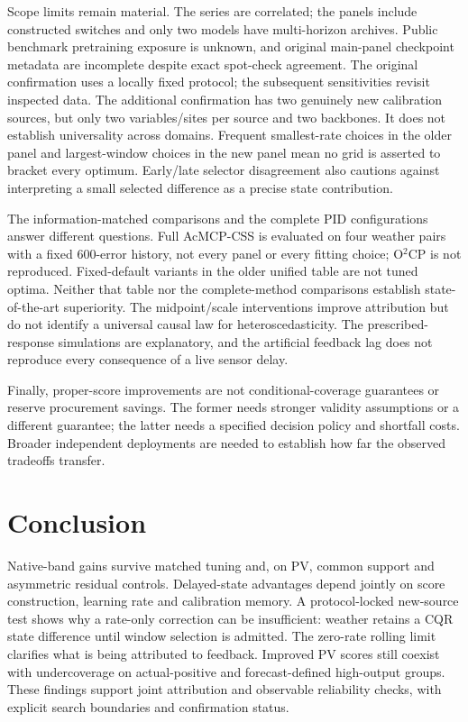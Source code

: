 \documentclass[preprint,11pt]{elsarticle}
\begin{document}
Scope limits remain material. The series are correlated; the panels include constructed
switches and only two models have multi-horizon archives. Public benchmark pretraining
exposure is unknown, and original main-panel checkpoint metadata are incomplete despite
exact spot-check agreement. The original confirmation uses a locally fixed protocol;
the subsequent sensitivities revisit inspected data. The additional confirmation has
two genuinely new calibration sources, but only two variables/sites per source and two
backbones. It does not establish universality across domains. Frequent smallest-rate
choices in the older panel and largest-window choices in the new panel mean no grid
is asserted to bracket every optimum. Early/late selector disagreement also cautions
against interpreting a small selected difference as a precise state contribution.

The information-matched comparisons and the complete PID configurations answer
different questions. Full AcMCP-CSS is evaluated on four weather pairs with a fixed
600-error history, not every panel or every fitting choice; O$^2$CP is not reproduced.
Fixed-default variants in the older unified table are not tuned optima. Neither that
table nor the complete-method comparisons establish state-of-the-art superiority.
The midpoint/scale interventions
improve attribution but do not identify a universal causal law for heteroscedasticity.
The prescribed-response simulations are explanatory, and the artificial feedback lag
does not reproduce every consequence of a live sensor delay.

Finally, proper-score improvements are not conditional-coverage guarantees or reserve
procurement savings. The former needs stronger validity assumptions or a different
guarantee; the latter needs a specified decision policy and shortfall costs. Broader
independent deployments are needed to establish how far the observed tradeoffs transfer.

\section{Conclusion}
Native-band gains survive matched tuning and, on PV, common support and asymmetric
residual controls. Delayed-state advantages depend jointly on score construction,
learning rate and calibration memory. A protocol-locked new-source test shows why
a rate-only correction can be insufficient: weather retains a CQR state difference
until window selection is admitted. The zero-rate rolling limit clarifies what is
being attributed to feedback. Improved PV scores still coexist with undercoverage
on actual-positive and forecast-defined high-output groups. These findings support
joint attribution and observable reliability checks, with explicit search boundaries
and confirmation status.
\end{document}
